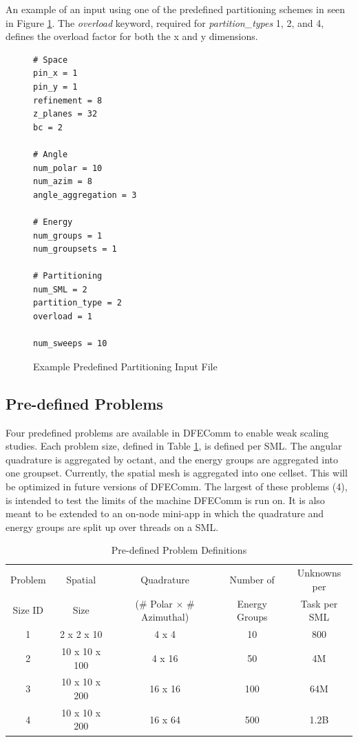 \documentclass{article}
\begin{document}
An example of an input using one of the predefined partitioning schemes in seen in Figure \ref{fig::partition}. The \emph{overload} keyword, required for \emph{partition\_types} 1, 2, and 4, defines the overload factor for both the x and y dimensions. \\

\begin{figure}[htbp]
\begin{verbatim}
# Space
pin_x = 1
pin_y = 1
refinement = 8
z_planes = 32
bc = 2

# Angle
num_polar = 10
num_azim = 8
angle_aggregation = 3

# Energy
num_groups = 1
num_groupsets = 1
  	
# Partitioning
num_SML = 2
partition_type = 2	
overload = 1

num_sweeps = 10
 \end{verbatim}  
    \caption[]{Example Predefined Partitioning Input File}\label{fig::partition}
\end{figure}

\subsection{Pre-defined Problems} \label{probdef}
Four predefined problems are available in DFEComm to enable weak scaling studies. Each problem size, defined in Table \ref{table::probsize}, is defined per SML. The angular quadrature is aggregated by octant, and the energy groups are aggregated into one groupset. Currently, the spatial mesh is aggregated into one cellset. This will be optimized in future versions of DFEComm. The largest of these problems (4), is intended to test the limits of the machine DFEComm is run on. It is also meant to be extended to an on-node mini-app in which the quadrature and energy groups are split up over threads on a SML.\\ \newline

\begin{table}[H]
\begin{center}
  \begin{tabular}{ |c| c | c|c| c|}
    \hline
    Problem & Spatial & Quadrature& Number of & Unknowns per \\ 
    Size ID & Size& (\# Polar $\times$ \# Azimuthal) &  Energy Groups & Task per SML\\
    \hline
    1 & 2 x 2 x 10 & 4 x 4 & 10 & 800\\ 
    2 & 10 x 10 x 100 & 4 x 16 & 50& 4M\\
    3 & 10 x 10 x 200& 16 x 16 & 100& 64M \\
    4 & 10 x 10 x 200& 16 x 64 & 500 & 1.2B \\
    \hline
  \end{tabular} 
      \caption{Pre-defined Problem Definitions}
      \label{table::probsize}
\end{center}
\end{table}
\end{document}
